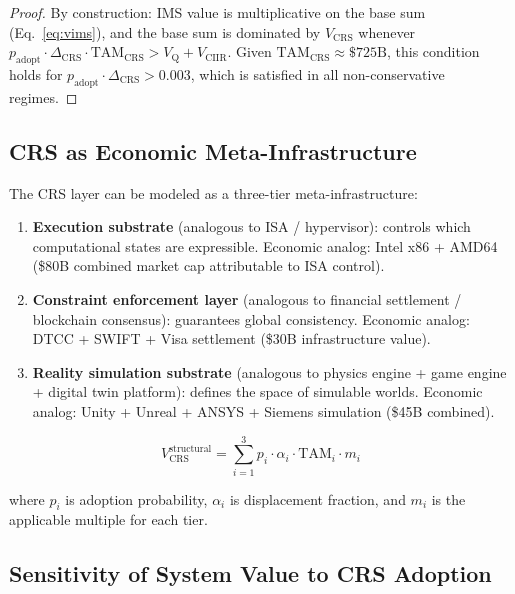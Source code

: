 \documentclass[11pt,a4paper]{article}
\theoremstyle{remark}
\newcommand{\VQ}{V_{\mathrm{Q}}}
\newcommand{\VCIIR}{V_{\mathrm{CIIR}}}
\newcommand{\VCRS}{V_{\mathrm{CRS}}}
\newcommand{\TAM}{\mathrm{TAM}}
\newcommand{\interpretive}[1]{\textcolor{blue!70!black}{#1}}
\begin{document}
\begin{proof}
By construction: IMS value is multiplicative on the base sum
(Eq.~\ref{eq:vims}), and the base sum is dominated by $\VCRS$
whenever $p_{\mathrm{adopt}} \cdot \Delta_{\mathrm{CRS}} \cdot
\TAM_{\mathrm{CRS}} > \VQ + \VCIIR$.  Given
$\TAM_{\mathrm{CRS}} \approx \$725\text{B}$, this condition holds
for $p_{\mathrm{adopt}} \cdot \Delta_{\mathrm{CRS}} > 0.003$,
which is satisfied in all non-conservative regimes.
\end{proof}

\subsection{CRS as Economic Meta-Infrastructure}

\interpretive{The CRS layer can be modeled as a three-tier
meta-infrastructure:}

\begin{enumerate}
  \item \textbf{Execution substrate} (analogous to ISA / hypervisor):
        controls which computational states are expressible.
        Economic analog: Intel x86 + AMD64 (\$80B combined market cap
        attributable to ISA control).
  \item \textbf{Constraint enforcement layer} (analogous to financial
        settlement / blockchain consensus): guarantees global
        consistency.  Economic analog: DTCC + SWIFT + Visa settlement
        (\$30B infrastructure value).
  \item \textbf{Reality simulation substrate} (analogous to physics
        engine + game engine + digital twin platform): defines the
        space of simulable worlds.  Economic analog: Unity + Unreal +
        ANSYS + Siemens simulation (\$45B combined).
\end{enumerate}

\begin{equation}
  \VCRS^{\mathrm{structural}}
  = \sum_{i=1}^{3} p_i \cdot \alpha_i \cdot \TAM_i \cdot m_i
  \label{eq:crs_structural}
\end{equation}

where $p_i$ is adoption probability, $\alpha_i$ is displacement
fraction, and $m_i$ is the applicable multiple for each tier.

\subsection{Sensitivity of System Value to CRS Adoption}
\end{document}

